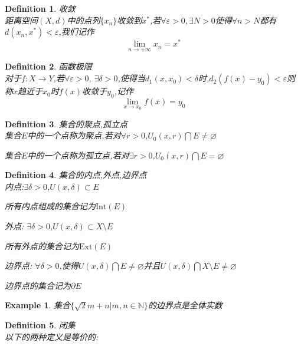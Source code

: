 \documentclass[11pt,hyperref,a4paper,UTF8]{ctexart}
\newtheorem{example}{Example}[subsection]
\newtheorem{definition}{Definition}[subsection]
\newcommand{\NN}{\mathbb{N}}
\begin{document}
\begin{CJK}{UTF8}{gkai}
\begin{definition}
  收敛\\

  距离空间$(X,d)$中的点列$\{x_n\}$收敛到$x^\ast$,若$\forall \varepsilon > 0,\exists N > 0$使得$\forall n > N$都有$d(x_n,x^\ast) < \varepsilon$,我们记作
  \[\lim_{n \to +\infty} x_n = x^\ast\]
\end{definition}

\begin{definition}
  函数极限\\

  对于$f: X \to Y$,若$\forall \varepsilon >0$, $\exists \delta > 0$,使得当$d_1(x,x_0) < \delta$时,$d_2(f(x) - y_0) < \varepsilon$则称$x$趋近于$x_0$时$f(x)$收敛于$y_0$,记作
  \[\lim_{x \to x_0}f(x) = y_0\]
\end{definition}

\begin{definition}
  集合的聚点,孤立点\\

  集合$E$中的一个点称为聚点,若对$\forall r > 0$,$U_0(x,r) \bigcap E \neq \varnothing$

  集合$E$中的一个点称为孤立点,若对$\exists r > 0$,$U_0(x,r) \bigcap E = \varnothing$
\end{definition}

\begin{definition}
  集合的内点,外点,边界点\\

  内点:$\exists \delta >0$,$U(x,\delta) \subset E$
  
  所有内点组成的集合记为$\text{Int}(E)$

  外点: $\exists \delta > 0$,$U(x,\delta) \subset X \setminus E$

  所有外点的集合记为$\text{Ext}(E)$

  边界点: $\forall \delta >0$,使得$U(x,\delta) \bigcap E \neq \varnothing$并且$U(x,\delta) \bigcap X\setminus E \neq \varnothing$

  边界点的集合记为$\partial E$
\end{definition}

\begin{example}
  集合$\{\sqrt{2}m + n| m,n \in \NN\}$的边界点是全体实数
\end{example}

\begin{definition}
  闭集\\

  以下的两种定义是等价的:


\end{definition}
\end{CJK}
\end{document}
